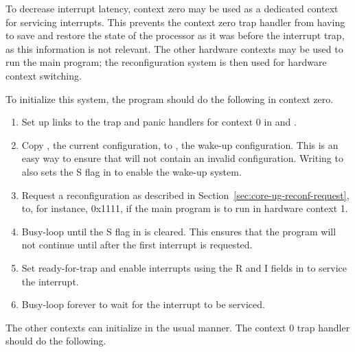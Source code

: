 To decrease interrupt latency, context zero may be used as a dedicated context
for servicing interrupts. This prevents the context zero trap handler from
having to save and restore the state of the processor as it was before the
interrupt trap, as this information is not relevant. The other hardware contexts
may be used to run the main program; the reconfiguration system is then used for
hardware context switching.

To initialize this system, the program should do the following in context zero.

\begin{enumerate}

\item Set up links to the trap and panic handlers for context 0 in  and
.

\item Copy , the current configuration, to , the wake-up
configuration. This is an easy way to ensure that  will not contain
an invalid configuration. Writing to  also sets the S flag in
 to enable the wake-up system.

\item Request a reconfiguration as described in 
Section~\ref{sec:core-ug-reconf-request}, to, for instance, 0x1111, if the main 
program is to run in hardware context 1.

\item Busy-loop until the S flag in  is cleared. This ensures that
the program will not continue until after the first interrupt is requested.

\item Set ready-for-trap and enable interrupts using the R and I fields in 
 to service the interrupt.

\item Busy-loop forever to wait for the interrupt to be serviced.

\end{enumerate}

\noindent The other contexts can initialize in the usual manner. The context 0 
trap handler should do the following.

